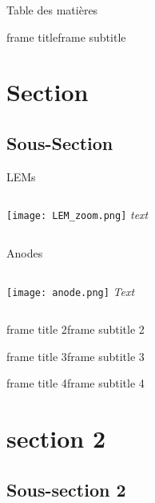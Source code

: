 




  {
  \begin{frame}\titlepage \vspace{-0.5cm}\end{frame}

  \begin{frame}{Table des matières}\tableofcontents\end{frame}}
  \setcounter{framenumber}{0}
  \begin{frame}{frame title}{frame subtitle}
    \section{Section}
      \subsection{Sous-Section}

      \begin{block}{LEMs}
        \begin{columns}
           \hspace{0.5cm}
          \texttt{[image: LEM\_zoom.png]} 
          \textit{text}
        \end{columns}
      \end{block}
      \pause
      \begin{block}{Anodes}
        \begin{columns}
           \hspace{0.5cm}
          \texttt{[image: anode.png]} 
          \textit{Text}
        \end{columns}
      \end{block}
  \end{frame}

  \begin{frame}{frame title 2}{frame subtitle 2}\end{frame}
  \begin{frame}{frame title 3}{frame subtitle 3}\end{frame}
  \begin{frame}{frame title 4}{frame subtitle 4}
    \section{section 2}
      \subsection{Sous-section 2}
        
  \end{frame}
    


